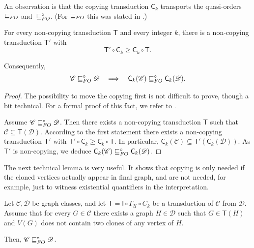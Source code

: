 \documentclass{lmcs}
\newcommand{\Cc}{\mathscr{C}}
\newcommand{\Dd}{\mathscr{D}}
\renewcommand{\FO}{{\rm FO}}
\theoremstyle{definition}
\begin{document}
An observation is that the copying transduction $\mathsf C_k$ transports the quasi-orders $\sqsubseteq_\FO$ and~$\sqsubseteq_\FO^\circ$. (For $\sqsubseteq_\FO$ this was stated in .)
\begin{fact}
	\label{fact:copymove}
	For every non-copying transduction $\mathsf T$ and every integer $k$, there is a  non-copying transduction $\mathsf T'$ with
	\[\mathsf T'\circ\mathsf C_k\geq \mathsf C_k\circ\mathsf T.\]
	
	Consequently,
\[
		\Cc\sqsubseteq_\FO^\circ\Dd\quad\Longrightarrow\quad \mathsf C_k(\Cc)\sqsubseteq_\FO^\circ\mathsf C_k(\Dd).\]
\end{fact}
\begin{proof}
	The possibility to move the copying first is not difficult to prove, though a bit technical. For a formal proof of this fact, we refer to \cite{SBE_TOCL}.
	
		Assume $\Cc\sqsubseteq_\FO^\circ\Dd$.
		Then there exists a non-copying transduction $\mathsf T$ such that $\Cc\subseteq\mathsf T(\Dd)$.
		According to the first statement there exists a non-copying transduction $\mathsf T'$ with $\mathsf T'\circ\mathsf C_k\geq \mathsf C_k\circ\mathsf T$. In particular, $\mathsf C_k(\Cc)\subseteq \mathsf T'(\mathsf C_k(\Dd))$. As $\mathsf T'$ is non-copying, we deduce
		$\mathsf C_k(\Cc)\sqsubseteq_\FO^\circ\mathsf C_k(\Dd)$.
\end{proof}

The next technical lemma is very useful. It shows that copying is only needed if the cloned vertices actually appear in final graph, and are not needed, for example, just to witness existential quantifiers in the interpretation.
\begin{lem}
	\label{lem:elim_copy}
	Let $\Cc,\Dd$ be graph classes, and let $\mathsf T=\mathsf I\circ\Gamma_{\mathcal U}\circ C_k$ be a transduction of $\Cc$ from $\Dd$.
	Assume that for every $G\in\Cc$ there exists a graph $H\in\Dd$ such that $G\in\mathsf T(H)$ and $V(G)$ does not contain two clones of any vertex of $H$.
	
	Then, $\Cc\sqsubseteq_\FO^\circ\Dd$.
\end{lem}
\end{document}
